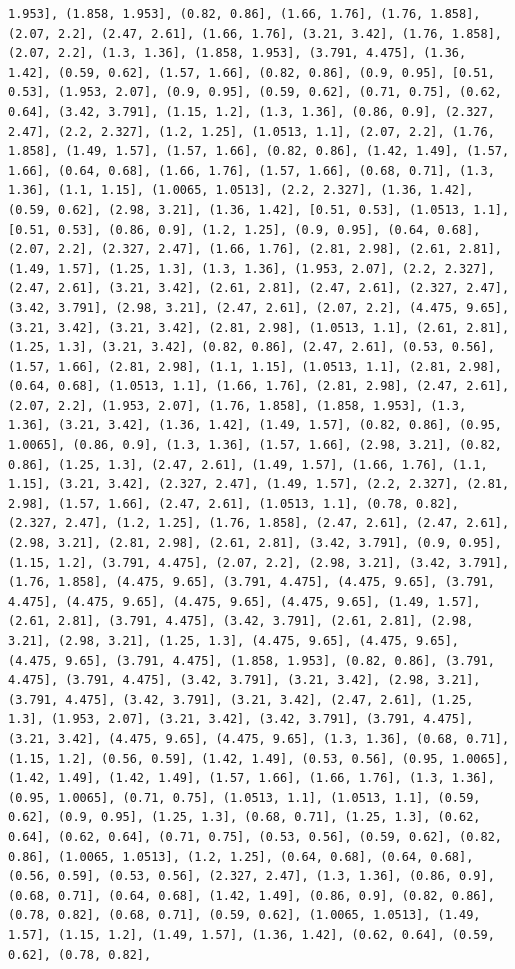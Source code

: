 \documentclass[12pt,fleqn]{article}\usepackage{../common}
\begin{document}
\begin{verbatim}
1.953], (1.858, 1.953], (0.82, 0.86], (1.66, 1.76], (1.76, 1.858], (2.07, 2.2], (2.47, 2.61], (1.66, 1.76], (3.21, 3.42], (1.76, 1.858], (2.07, 2.2], (1.3, 1.36], (1.858, 1.953], (3.791, 4.475], (1.36, 1.42], (0.59, 0.62], (1.57, 1.66], (0.82, 0.86], (0.9, 0.95], [0.51, 0.53], (1.953, 2.07], (0.9, 0.95], (0.59, 0.62], (0.71, 0.75], (0.62, 0.64], (3.42, 3.791], (1.15, 1.2], (1.3, 1.36], (0.86, 0.9], (2.327, 2.47], (2.2, 2.327], (1.2, 1.25], (1.0513, 1.1], (2.07, 2.2], (1.76, 1.858], (1.49, 1.57], (1.57, 1.66], (0.82, 0.86], (1.42, 1.49], (1.57, 1.66], (0.64, 0.68], (1.66, 1.76], (1.57, 1.66], (0.68, 0.71], (1.3, 1.36], (1.1, 1.15], (1.0065, 1.0513], (2.2, 2.327], (1.36, 1.42], (0.59, 0.62], (2.98, 3.21], (1.36, 1.42], [0.51, 0.53], (1.0513, 1.1], [0.51, 0.53], (0.86, 0.9], (1.2, 1.25], (0.9, 0.95], (0.64, 0.68], (2.07, 2.2], (2.327, 2.47], (1.66, 1.76], (2.81, 2.98], (2.61, 2.81], (1.49, 1.57], (1.25, 1.3], (1.3, 1.36], (1.953, 2.07], (2.2, 2.327], (2.47, 2.61], (3.21, 3.42], (2.61, 2.81], (2.47, 2.61], (2.327, 2.47], (3.42, 3.791], (2.98, 3.21], (2.47, 2.61], (2.07, 2.2], (4.475, 9.65], (3.21, 3.42], (3.21, 3.42], (2.81, 2.98], (1.0513, 1.1], (2.61, 2.81], (1.25, 1.3], (3.21, 3.42], (0.82, 0.86], (2.47, 2.61], (0.53, 0.56], (1.57, 1.66], (2.81, 2.98], (1.1, 1.15], (1.0513, 1.1], (2.81, 2.98], (0.64, 0.68], (1.0513, 1.1], (1.66, 1.76], (2.81, 2.98], (2.47, 2.61], (2.07, 2.2], (1.953, 2.07], (1.76, 1.858], (1.858, 1.953], (1.3, 1.36], (3.21, 3.42], (1.36, 1.42], (1.49, 1.57], (0.82, 0.86], (0.95, 1.0065], (0.86, 0.9], (1.3, 1.36], (1.57, 1.66], (2.98, 3.21], (0.82, 0.86], (1.25, 1.3], (2.47, 2.61], (1.49, 1.57], (1.66, 1.76], (1.1, 1.15], (3.21, 3.42], (2.327, 2.47], (1.49, 1.57], (2.2, 2.327], (2.81, 2.98], (1.57, 1.66], (2.47, 2.61], (1.0513, 1.1], (0.78, 0.82], (2.327, 2.47], (1.2, 1.25], (1.76, 1.858], (2.47, 2.61], (2.47, 2.61], (2.98, 3.21], (2.81, 2.98], (2.61, 2.81], (3.42, 3.791], (0.9, 0.95], (1.15, 1.2], (3.791, 4.475], (2.07, 2.2], (2.98, 3.21], (3.42, 3.791], (1.76, 1.858], (4.475, 9.65], (3.791, 4.475], (4.475, 9.65], (3.791, 4.475], (4.475, 9.65], (4.475, 9.65], (4.475, 9.65], (1.49, 1.57], (2.61, 2.81], (3.791, 4.475], (3.42, 3.791], (2.61, 2.81], (2.98, 3.21], (2.98, 3.21], (1.25, 1.3], (4.475, 9.65], (4.475, 9.65], (4.475, 9.65], (3.791, 4.475], (1.858, 1.953], (0.82, 0.86], (3.791, 4.475], (3.791, 4.475], (3.42, 3.791], (3.21, 3.42], (2.98, 3.21], (3.791, 4.475], (3.42, 3.791], (3.21, 3.42], (2.47, 2.61], (1.25, 1.3], (1.953, 2.07], (3.21, 3.42], (3.42, 3.791], (3.791, 4.475], (3.21, 3.42], (4.475, 9.65], (4.475, 9.65], (1.3, 1.36], (0.68, 0.71], (1.15, 1.2], (0.56, 0.59], (1.42, 1.49], (0.53, 0.56], (0.95, 1.0065], (1.42, 1.49], (1.42, 1.49], (1.57, 1.66], (1.66, 1.76], (1.3, 1.36], (0.95, 1.0065], (0.71, 0.75], (1.0513, 1.1], (1.0513, 1.1], (0.59, 0.62], (0.9, 0.95], (1.25, 1.3], (0.68, 0.71], (1.25, 1.3], (0.62, 0.64], (0.62, 0.64], (0.71, 0.75], (0.53, 0.56], (0.59, 0.62], (0.82, 0.86], (1.0065, 1.0513], (1.2, 1.25], (0.64, 0.68], (0.64, 0.68], (0.56, 0.59], (0.53, 0.56], (2.327, 2.47], (1.3, 1.36], (0.86, 0.9], (0.68, 0.71], (0.64, 0.68], (1.42, 1.49], (0.86, 0.9], (0.82, 0.86], (0.78, 0.82], (0.68, 0.71], (0.59, 0.62], (1.0065, 1.0513], (1.49, 1.57], (1.15, 1.2], (1.49, 1.57], (1.36, 1.42], (0.62, 0.64], (0.59, 0.62], (0.78, 0.82], 
\end{verbatim}
\end{document}
